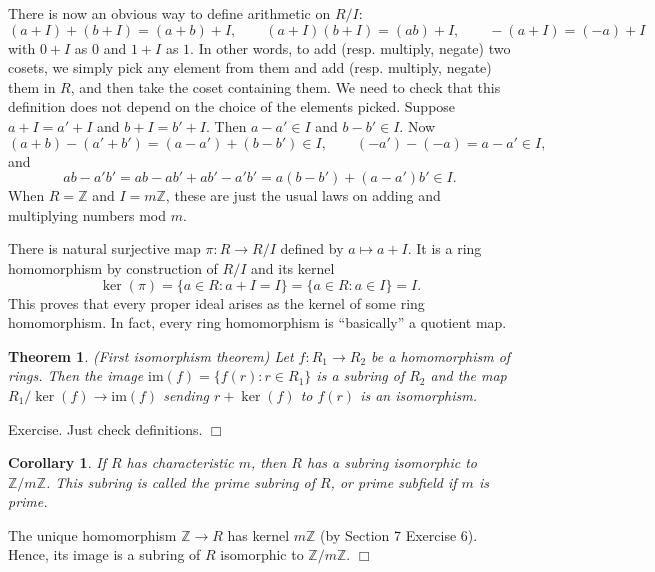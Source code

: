 \documentclass{article}
\def\Z{{\mathbb Z}}
\def\Z{{\mathbb Z}}
\newtheorem{theorem}[subsection]{Theorem}
\newtheorem{cor}[subsection]{Corollary}
\newenvironment{proof}{\noindent {\bf Proof:}}{$\Box$ \vspace{2 ex}}
\begin{document}
There is now an obvious way to define arithmetic on $R/I$:
$$(a + I) + (b + I) = (a+b) + I,\qquad (a + I)(b + I) = (ab) + I, \qquad -(a + I) = (-a)+ I$$
with $0+I$ as $0$ and $1+I$ as $1$. In other words, to add (resp. multiply, negate) two cosets, we simply pick any element from them and add (resp. multiply, negate) them in $R$, and then take the coset containing them. We need to check that this definition does not depend on the choice of the elements picked. Suppose $a+I = a'+I$ and $b+I = b'+I$. Then $a - a'\in I$ and $b - b'\in I$. Now
$$(a + b) - (a' + b') = (a - a') + (b - b') \in I,\qquad (-a') - (-a) = a - a'\in I,$$
and
$$ab - a'b' = ab - ab' + ab' - a'b' = a(b - b') + (a - a')b' \in I.$$
When $R = \Z$ and $I = m\Z$, these are just the usual laws on adding and multiplying numbers mod $m$.

There is natural surjective map $\pi:R\rightarrow R/I$ defined by $a\mapsto a+I$. It is a ring homomorphism by construction of $R/I$ and its kernel
$$\ker(\pi) = \{a\in R\colon a + I = I\} = \{a\in R\colon a\in I\} = I.$$
This proves that every proper ideal arises as the kernel of some ring homomorphism. In fact, every ring homomorphism is ``basically'' a quotient map. %

\begin{theorem}
    (First isomorphism theorem) Let $f:R_1\rightarrow R_2$ be a homomorphism of rings. Then the image $\text{im}(f) = \{f(r)\colon r\in R_1\}$ is a subring of $R_2$ and the map $R_1/\ker(f)\rightarrow\text{im}(f)$ sending $r + \ker(f)$ to $f(r)$ is an isomorphism.
\end{theorem}

\begin{proof}
    Exercise. Just check definitions.
\end{proof}

\begin{cor}
    If $R$ has characteristic $m$, then $R$ has a subring isomorphic to $\Z/m\Z$. This subring is called the prime subring of $R$, or prime subfield if $m$ is prime. 
\end{cor}

\begin{proof}
    The unique homomorphism $\Z\rightarrow R$ has kernel $m\Z$ (by Section 7 Exercise 6). Hence, its image is a subring of $R$ isomorphic to $\Z/m\Z$.
\end{proof}
\end{document}

